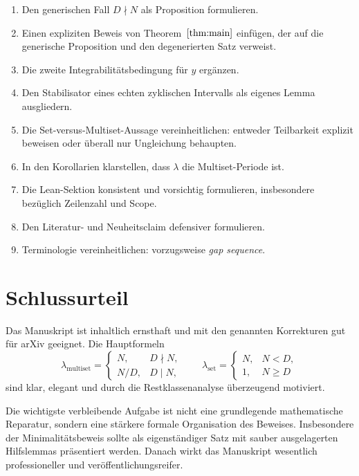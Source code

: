 \documentclass[11pt]{article}
\begin{document}
\begin{enumerate}[leftmargin=2em]
    \item Den generischen Fall \(D\nmid N\) als Proposition formulieren.
    \item Einen expliziten Beweis von Theorem~\(\ref{thm:main}\) einfügen, der auf die generische Proposition und den degenerierten Satz verweist.
    \item Die zweite Integrabilitätsbedingung für \(y\) ergänzen.
    \item Den Stabilisator eines echten zyklischen Intervalls als eigenes Lemma ausgliedern.
    \item Die Set-versus-Multiset-Aussage vereinheitlichen: entweder Teilbarkeit explizit beweisen oder überall nur Ungleichung behaupten.
    \item In den Korollarien klarstellen, dass \(\lambda\) die Multiset-Periode ist.
    \item Die Lean-Sektion konsistent und vorsichtig formulieren, insbesondere bezüglich Zeilenzahl und Scope.
    \item Den Literatur- und Neuheitsclaim defensiver formulieren.
    \item Terminologie vereinheitlichen: vorzugsweise \emph{gap sequence}.
\end{enumerate}

\section*{Schlussurteil}

Das Manuskript ist inhaltlich ernsthaft und mit den genannten Korrekturen gut für arXiv geeignet. Die Hauptformeln
\[
\lambda_{\mathrm{multiset}}=
\begin{cases}
N,&D\nmid N,\\
N/D,&D\mid N,
\end{cases}
\qquad
\lambda_{\mathrm{set}}=
\begin{cases}
N,&N<D,\\
1,&N\ge D
\end{cases}
\]
sind klar, elegant und durch die Restklassenanalyse überzeugend motiviert.

Die wichtigste verbleibende Aufgabe ist nicht eine grundlegende mathematische Reparatur, sondern eine stärkere formale Organisation des Beweises. Insbesondere der Minimalitätsbeweis sollte als eigenständiger Satz mit sauber ausgelagerten Hilfslemmas präsentiert werden. Danach wirkt das Manuskript wesentlich professioneller und veröffentlichungsreifer.
\end{document}
